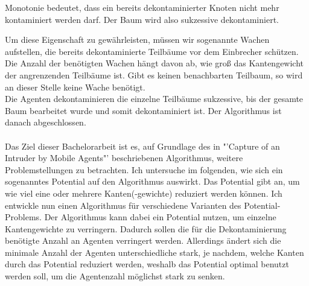 \begin{mydef}\label{def_monotonie}
	Monotonie bedeutet, dass ein bereits dekontaminierter Knoten nicht mehr kontaminiert werden darf. Der Baum wird also sukzessive dekontaminiert. 
\end{mydef}
 Um diese Eigenschaft zu gewährleisten, müssen wir sogenannte Wachen aufstellen, die bereits dekontaminierte Teilbäume vor dem Einbrecher schützen. Die Anzahl der benötigten Wachen hängt davon ab, wie groß das Kantengewicht der angrenzenden Teilbäume ist. Gibt es keinen benachbarten Teilbaum, so wird an dieser Stelle keine Wache benötigt.\\
Die Agenten dekontaminieren die einzelne Teilbäume sukzessive, bis der gesamte Baum bearbeitet wurde und somit dekontaminiert ist. Der Algorithmus ist danach abgeschlossen.
\\
\\
Das Ziel dieser Bachelorarbeit ist es, auf Grundlage des in "'Capture of an Intruder by Mobile Agents"' \cite{cima_paper} beschriebenen Algorithmus, weitere Problemstellungen zu betrachten. Ich untersuche im folgenden, wie sich ein sogenanntes Potential auf den Algorithmus auswirkt. Das Potential gibt an, um wie viel eine oder mehrere Kanten(-gewichte) reduziert werden können. Ich entwickle nun einen Algorithmus für verschiedene Varianten des Potential-Problems. Der Algorithmus kann dabei ein Potential nutzen, um einzelne Kantengewichte zu verringern. Dadurch sollen die für die Dekontaminierung benötigte Anzahl an Agenten verringert werden. Allerdings ändert sich die minimale Anzahl der Agenten unterschiedliche stark, je nachdem, welche Kanten durch das Potential reduziert werden, weshalb das Potential optimal benutzt werden soll, um die Agentenzahl möglichst stark zu senken.
\\

